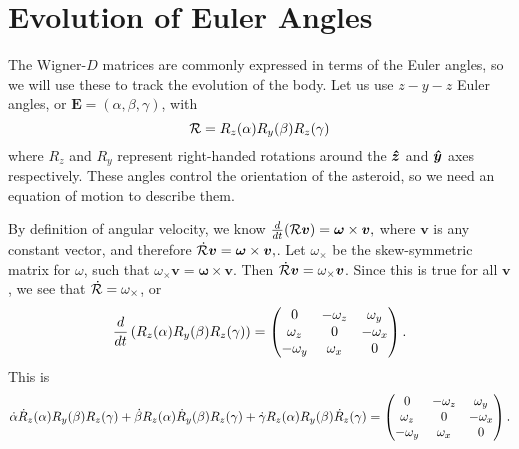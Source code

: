 \documentclass[aps,twocolumn,secnumarabic,balancelastpage,amsmath,amssymb,nofootinbib,floatfix]{revtex4-1}
\begin{document}
\section{Evolution of Euler Angles}
The Wigner-$D$ matrices are commonly expressed in terms of the Euler angles, so we will use these to track the evolution of the body. Let us use $z-y-z$ Euler angles, or $\bm E = (\alpha, \beta, \gamma)$, with
\begin{equation}
\mathcal{R} = R_z(\alpha) R_y(\beta) R_z(\gamma)
\label{eqn:euler-angle-rotation}
\end{equation}
where $R_z$ and $R_y$ represent right-handed rotations around the $\bm{\hat z}$ and $\bm{\hat y}$ axes respectively. These angles control the orientation of the asteroid, so we need an equation of motion to describe them.

By definition of angular velocity, we know $\frac{d}{dt}(\mathcal{R} \bm v) = \bm \omega \times \bm v,$ where $\bm v$ is any constant vector, and therefore $\dot {\mathcal{R}} \bm v = \bm \omega \times \bm v,$. Let $\omega_{\times}$ be the skew-symmetric matrix for $\omega$, such that $\omega_{\times} \bm v = \bm\omega \times \bm v$. Then $\dot {\mathcal{R}} \bm v = \omega_\times \bm v$. Since this is true for all $\bm v$, we see that $\dot {\mathcal{R}} = \omega_\times$, or
$$\frac{d}{dt}\left( R_z(\alpha)R_y(\beta)R_z(\gamma) \right) = \left( \begin{matrix}
0 & -\omega_z & \omega_y \\
\omega_z & 0 & -\omega_x \\
-\omega_y & \omega_x & 0
 \end{matrix} \right).$$
 This is
 $$\dot \alpha \dot R_z(\alpha)R_y(\beta)R_z(\gamma) + \dot \beta R_z(\alpha)\dot R_y(\beta)R_z(\gamma) + \dot \gamma R_z(\alpha)R_y(\beta)\dot R_z(\gamma) = \left( \begin{matrix}
 0 & -\omega_z & \omega_y \\
 \omega_z & 0 & -\omega_x \\
 -\omega_y & \omega_x & 0
  \end{matrix} \right).$$





\end{document}
